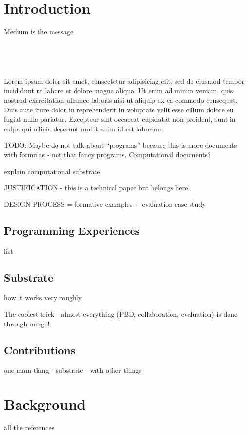 \documentclass[sigconf]{acmart}
\begin{document}
\newpage

\section{Introduction}

Medium is the message

~

~

Lorem ipsum dolor sit amet, consectetur adipisicing elit, sed do eiusmod tempor incididunt ut labore et dolore magna aliqua. Ut enim ad minim veniam, quis nostrud exercitation ullamco laboris nisi ut aliquip ex ea commodo consequat. Duis aute irure dolor in reprehenderit in voluptate velit esse cillum dolore eu fugiat nulla pariatur. Excepteur sint occaecat cupidatat non proident, sunt in culpa qui officia deserunt mollit anim id est laborum.

TODO: Maybe do not talk about ``programs'' because this is more documents with formulas - not that fancy programs.
Computational documents?

explain computational substrate

JUSTIFICATION - this is a technical paper but belongs here!

DESIGN PROCESS = formative examples + evaluation case study


\subsection{Programming Experiences}
list

\subsection{Substrate}
how it works very roughly

The coolest trick - almost everything (PBD, collaboration, evaluation) is done through merge!

\subsection{Contributions}
one main thing - substrate - with other things


\section{Background}
all the references

\end{document}
